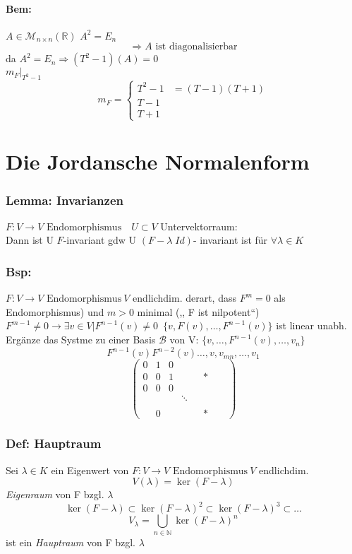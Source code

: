 \documentclass[titlepage,12pt,a4paper,ngerman]{report}
\newcommand{\tx}[1]{\textrm{#1}}
\newcommand{\enph}{F: V \to V \textrm{ Endomorphismus}}
\begin{document}
\subsubsection{Bem:} $A\in \mathcal{M}_{n \times n} (\mathbb{R})$
$ A^2 = E_n$
$$\Rightarrow A \tx{ ist diagonalisierbar}$$
da $A^2 = E_n \Rightarrow (T^2-1) (A) = 0$\\
$m_F | _{T^2-1}$
$$ m_F = \left\{ \begin{array}{ll}
T^2-1 & = (T-1)(T+1) \\
T-1 \\
T+1
\end{array} \right.$$

\chapter{Die Jordansche Normalenform}
\subsection{Lemma: Invarianzen}
$\enph \quad U \subset V$ Untervektorraum:\\
Dann ist U $F$-invariant gdw
U $ (F-\lambda \; Id)$- invariant ist für $ \forall \lambda \in K$
\subsection{Bsp:}
$\enph \ V$ endlichdim. derart, dass 
$F^m = 0$ als Endomorphismus) und $m>0$ minimal (,, F ist nilpotent``)\\
$ F^{m-1} \neq 0 \rightarrow \exists v \in V | F^{n-1}(v) \neq 0$\
$\{v,F(v),\dots,F^{n-1}(v)\}$ ist linear unabh.\\
Ergänze das Systme zu einer Basis $\mathcal{B}$ von V: $\{v, \dots , F^{n-1}(v), \dots , v_n\}$
$$F^{n-1}(v) F^{n-2}(v) \dots, v, v_{mn} , \dots , v_1$$
$$\begin{pmatrix}
0 & 1 & 0 & \\
0 & 0 & 1 & & & * & & \\
0 & 0 & 0 & \\
&&& \ddots\\ 
\\
& 0 & & & & *
\end{pmatrix}$$

\subsection{Def: Hauptraum}
Sei $\lambda \in K$ ein Eigenwert von $\enph \ V$ endlichdim.
$$ V(\lambda) = \ker ( F-\lambda )$$
\emph{Eigenraum} von F bzgl. $\lambda$
$$ \ker(F-\lambda) \subset \ker(F-\lambda)^2 \subset \ker(F-\lambda)^3 \subset \dots$$
$$V_\lambda = \bigcup_{n\in \mathbb{N}} \ker(F-\lambda)^n$$
ist ein\emph{ Hauptraum} von F bzgl. $\lambda$
\end{document}
